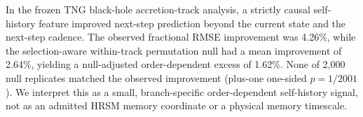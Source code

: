 In the frozen TNG black-hole accretion-track analysis, a strictly causal
self-history feature improved next-step prediction beyond the current state and
the next-step cadence. The observed fractional RMSE improvement was 4.26\%,
while the selection-aware within-track permutation null had a mean improvement
of 2.64\%, yielding a null-adjusted order-dependent excess of 1.62\%. None of
2,000 null replicates matched the observed improvement (plus-one one-sided
$p=1/2001$). We interpret this as a small, branch-specific order-dependent
self-history signal, not as an admitted HRSM memory coordinate or a physical
memory timescale.
